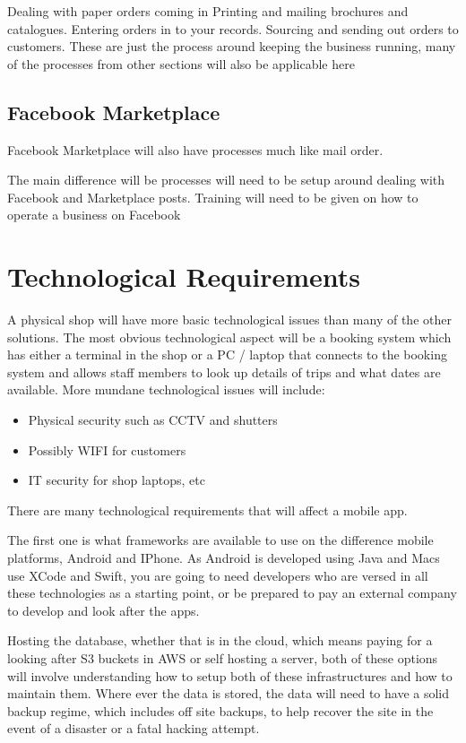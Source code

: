 \documentclass{article}
\begin{document}
Dealing with paper orders coming in
Printing and mailing brochures and catalogues.
Entering orders in to your records.
Sourcing and sending out orders to customers.
These are just the process around keeping the business running, many of the processes from other sections will also be applicable here


\subsection{Facebook Marketplace}
Facebook Marketplace will also have processes much like mail order.

The main difference will be processes will need to be setup around dealing with Facebook and Marketplace posts.
Training will need to be given on how to operate a business on Facebook
    


\pagebreak
\section{Technological Requirements}
A physical shop will have more basic technological issues than many of the other solutions.
The most obvious technological aspect will be a booking system which has either a terminal in the shop or a PC / laptop that connects to the booking system and allows staff members to look up details of trips and what dates are available.
More mundane technological issues will include:
    \begin{itemize}
    \item Physical security such as CCTV and shutters
    \item Possibly WIFI for customers
    \item IT security for shop laptops, etc
\end{itemize}


There are many technological requirements that will affect a mobile app.

The first one is what frameworks are available to use on the difference mobile platforms, Android and IPhone. As Android is developed using Java and Macs use XCode and Swift, you are going to need developers who are versed in all these technologies as a starting point, or be prepared to pay an external company to develop and look after the apps.


Hosting the database, whether that is in the cloud, which means paying for a looking after S3 buckets in AWS or self hosting a server, both of these options will involve understanding how to setup both of these infrastructures and how to maintain them. Where ever the data is stored, the data will need to have a solid backup regime, which includes off site backups, to help recover the site in the event of a disaster or a fatal hacking attempt.
\end{document}
